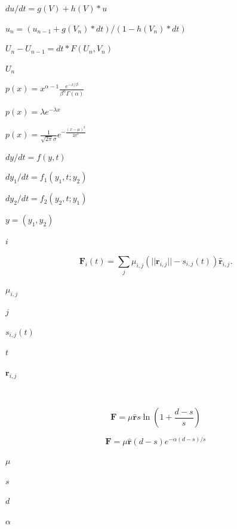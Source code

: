 \documentclass{article}
\begin{document}
$du/dt = g(V) + h(V)*u$
\pagebreak

$u_n = ( u_{n-1} + g(V_n)*dt ) / ( 1 - h(V_n)*dt )$
\pagebreak

$U_n - U_{n-1} = dt*F(U_n, V_n)$
\pagebreak

$U_n$
\pagebreak

$\displaystyle p(x) = x^{\alpha-1}\frac{e^{-x/\beta}}{\beta^\alpha\Gamma(\alpha)}$
\pagebreak

$\displaystyle p(x) = \lambda e^{-\lambda x}$
\pagebreak

$\displaystyle p(x) =
  \frac{1}{\sqrt{2\pi}\sigma} e^{-\frac{(x-\mu)^2}{2\sigma^2}}
$
\pagebreak

$dy/dt = f(y, t)$
\pagebreak

$dy_1/dt = f_1(y_1, t; y_2)$
\pagebreak

$dy_2/dt = f_2(y_2, t; y_1)$
\pagebreak

$y = (y_1, y_2)$
\pagebreak

$i$
\pagebreak

\[
\mathbf{F}_{i}(t) = \sum_{j} \mu_{i,j} ( || \mathbf{r}_{i,j} || - s_{i,j}(t) ) \hat{\mathbf{r}}_{i,j}.
\]
\pagebreak

$\mu_{i,j}$
\pagebreak

$j$
\pagebreak

$s_{i,j}(t)$
\pagebreak

$t$
\pagebreak

$\mathbf{r}_{i,j}$
\pagebreak

$\hat{}$
\pagebreak

\[
\mathbf{F} = \mu \hat{\mathbf{r}} s \ln\!\left(1 + \frac{d - s}{s}\right)
\]
\pagebreak

\[
\mathbf{F} = \mu \hat{\mathbf{r}} (d - s) e^{-\alpha(d-s)/s}
\]
\pagebreak

$\mu$
\pagebreak

$s$
\pagebreak

$d$
\pagebreak

$\alpha$
\pagebreak
\end{document}
